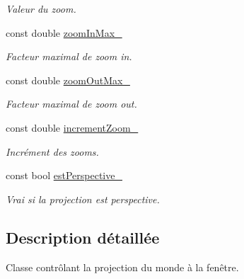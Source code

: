 \begin{DoxyCompactItemize}
\begin{DoxyCompactList}\small\item\em Valeur du zoom. \end{DoxyCompactList}\item 
\hypertarget{classvue_1_1_projection_ada0dd83663ea60af42c1b907dc9eea3b}{const double \hyperlink{classvue_1_1_projection_ada0dd83663ea60af42c1b907dc9eea3b}{zoom\-In\-Max\-\_\-}}\label{classvue_1_1_projection_ada0dd83663ea60af42c1b907dc9eea3b}

\begin{DoxyCompactList}\small\item\em Facteur maximal de zoom in. \end{DoxyCompactList}\item 
\hypertarget{classvue_1_1_projection_a6c1d3823cb92516327cddfd985587b5c}{const double \hyperlink{classvue_1_1_projection_a6c1d3823cb92516327cddfd985587b5c}{zoom\-Out\-Max\-\_\-}}\label{classvue_1_1_projection_a6c1d3823cb92516327cddfd985587b5c}

\begin{DoxyCompactList}\small\item\em Facteur maximal de zoom out. \end{DoxyCompactList}\item 
\hypertarget{classvue_1_1_projection_abf6f52e53ca42685abe66814a6e140df}{const double \hyperlink{classvue_1_1_projection_abf6f52e53ca42685abe66814a6e140df}{increment\-Zoom\-\_\-}}\label{classvue_1_1_projection_abf6f52e53ca42685abe66814a6e140df}

\begin{DoxyCompactList}\small\item\em Incrément des zooms. \end{DoxyCompactList}\item 
\hypertarget{classvue_1_1_projection_a28720ca4dd92651253292851c740b020}{const bool \hyperlink{classvue_1_1_projection_a28720ca4dd92651253292851c740b020}{est\-Perspective\-\_\-}}\label{classvue_1_1_projection_a28720ca4dd92651253292851c740b020}

\begin{DoxyCompactList}\small\item\em Vrai si la projection est perspective. \end{DoxyCompactList}\end{DoxyCompactItemize}


\subsection{Description détaillée}
Classe contrôlant la projection du monde à la fenêtre. 

